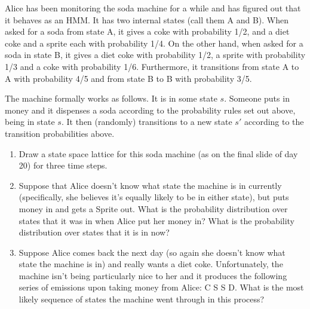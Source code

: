 \documentclass[fleqn]{hermans-hw}
\begin{document}
Alice has been monitoring the soda machine for a while and has figured
out that it behaves as an HMM.  It has two internal states (call them
A and B).  When asked for a soda from state A, it gives a coke with
probability 1/2, and a diet coke and a sprite each with probability
1/4.  On the other hand, when asked for a soda in state B, it gives a
diet coke with probability 1/2, a sprite with probability 1/3 and a
coke with probability 1/6.  Furthermore, it transitions from state A
to A with probability 4/5 and from state B to B with probability 3/5.

The machine formally works as follows.  It is in some state $s$.
Someone puts in money and it dispenses a soda according to the
probability rules set out above, being in state $s$.  It then
(randomly) transitions to a new state $s'$ according to the transition
probabilities above.

\begin{enumerate}
\item Draw a state space lattice for this soda machine (as on the final slide of day 20) for three time steps.

\item Suppose that Alice doesn't know what state the machine is in
  currently (specifically, she believes it's equally likely to be in
  either state), but puts money in and gets a Sprite out.  What is the
  probability distribution over states that it was in when Alice put
  her money in?  What is the probability distribution over states that
  it is in now?

\item Suppose Alice comes back the next day (so again she doesn't know
  what state the machine is in) and really wants a diet coke.
  Unfortunately, the machine isn't being particularly nice to her and
  it produces the following series of emissions upon taking money from
  Alice: C S S D.  What is the most likely sequence of states the
  machine went through in this process?
\end{enumerate}
\end{document}
